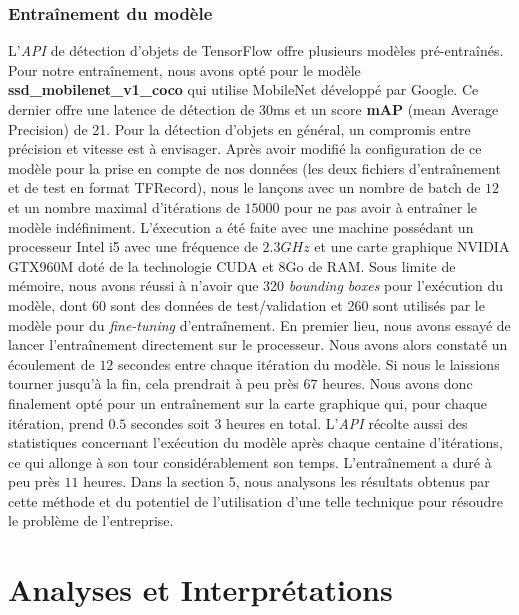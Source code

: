 \documentclass[french]{article}
\theoremstyle{mytheoremstyle}
\theoremstyle{mytheoremstyle}
\theoremstyle{myproblemstyle}
\begin{document}
        \subsubsection{Entraînement du modèle}
        L'\emph{API} de détection d'objets de TensorFlow offre plusieurs modèles pré-entraînés. Pour notre entraînement, nous avons opté pour le modèle \textbf{ssd\_mobilenet\_v1\_coco}\cite{pretrainedmodel} qui utilise MobileNet développé par Google. Ce dernier offre une latence de détection de 30ms et un score \textbf{mAP} (mean Average Precision) de 21. Pour la détection d'objets en général, un compromis entre précision et vitesse est à envisager. Après avoir modifié la configuration de ce modèle pour la prise en compte de nos données (les deux fichiers d'entraînement et de test en format TFRecord), nous le lançons avec un nombre de batch de $12$ et un nombre maximal d'itérations de $15 000$ pour ne pas avoir à entraîner le modèle indéfiniment. L'éxecution a été faite avec une machine possédant un processeur Intel i5 avec une fréquence de $2.3GHz$ et une carte graphique NVIDIA GTX960M doté de la technologie CUDA et 8Go de RAM. Sous limite de mémoire, nous avons réussi à n'avoir que 320 \emph{bounding boxes} pour l'exécution du modèle, dont 60 sont des données de test/validation et 260 sont utilisés par le modèle pour du \emph{fine-tuning} d'entraînement. En premier lieu, nous avons essayé de lancer l'entraînement directement sur le processeur. Nous avons alors constaté un écoulement de $12$ secondes entre chaque itération du modèle. Si nous le laissions tourner jusqu'à la fin, cela prendrait à peu près $67$ heures. Nous avons donc finalement opté pour un entraînement sur la carte graphique qui, pour chaque itération, prend $0.5$ secondes soit $3$ heures en total. L'\emph{API} récolte aussi des statistiques concernant l'exécution du modèle après chaque centaine d'itérations, ce qui allonge à son tour considérablement son temps.
        \newline
        \indent L'entraînement a duré à peu près $11$ heures. Dans la section 5, nous analysons les résultats obtenus par cette méthode et du potentiel de l'utilisation d'une telle technique pour résoudre le problème de l'entreprise.

    \section{Analyses et Interprétations}
\end{document}
